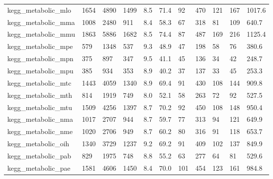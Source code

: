 \begin{longtable}{lllllllllll}
 kegg\_metabolic\_mlo                                 & 1654       & 4890      & 1499  & 8.5    & 71.4   & 92    & 470    & 121    & 167    & 1017.6  \\
 kegg\_metabolic\_mma                                 & 1008       & 2480      & 911   & 8.4    & 58.3   & 67    & 318    & 81     & 109    & 640.7   \\
 kegg\_metabolic\_mmu                                 & 1863       & 5886      & 1682  & 8.5    & 74.4   & 87    & 487    & 169    & 216    & 1125.4  \\
 kegg\_metabolic\_mpe                                 & 579        & 1348      & 537   & 9.3    & 48.9   & 47    & 198    & 58     & 76     & 380.6   \\
 kegg\_metabolic\_mpn                                 & 375        & 897       & 347   & 9.5    & 41.1   & 45    & 136    & 34     & 42     & 248.7   \\
 kegg\_metabolic\_mpu                                 & 385        & 934       & 353   & 8.9    & 40.2   & 37    & 137    & 33     & 45     & 253.3   \\
 kegg\_metabolic\_mtc                                 & 1443       & 4059      & 1340  & 8.9    & 69.4   & 91    & 430    & 108    & 144    & 909.8   \\
 kegg\_metabolic\_mth                                 & 814        & 1919      & 749   & 8.0    & 52.1   & 58    & 263    & 72     & 92     & 527.5   \\
 kegg\_metabolic\_mtu                                 & 1509       & 4256      & 1397  & 8.7    & 70.2   & 92    & 450    & 108    & 148    & 950.4   \\
 kegg\_metabolic\_nma                                 & 1017       & 2707      & 944   & 8.7    & 59.7   & 77    & 313    & 94     & 121    & 649.9   \\
 kegg\_metabolic\_nme                                 & 1020       & 2706      & 949   & 8.7    & 60.2   & 80    & 316    & 91     & 118    & 653.7   \\
 kegg\_metabolic\_oih                                 & 1340       & 3729      & 1237  & 9.2    & 69.2   & 91    & 409    & 102    & 137    & 849.9   \\
 kegg\_metabolic\_pab                                 & 829        & 1975      & 748   & 8.8    & 55.2   & 63    & 277    & 64     & 81     & 529.6   \\
 kegg\_metabolic\_pae                                 & 1581       & 4606      & 1450  & 8.4    & 70.0   & 101   & 454    & 123    & 161    & 984.8   \\

\end{longtable}
